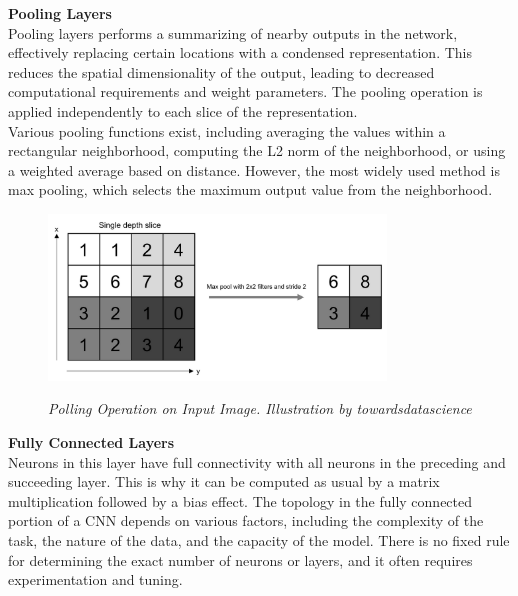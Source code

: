 \newpage

\vspace{0.5cm}
\textbf{Pooling Layers} \\

Pooling layers performs a summarizing of nearby outputs in the network, effectively replacing certain locations with a condensed representation. This reduces the spatial dimensionality of the output, leading to decreased computational requirements and weight parameters. The pooling operation is applied independently to each slice of the representation. \\

Various pooling functions exist, including averaging the values within a rectangular neighborhood, computing the L2 norm of the neighborhood, or using a weighted average based on distance. However, the most widely used method is max pooling, which selects the maximum output value from the neighborhood.

\begin{figure}[H]
\centering
\includegraphics[width=0.8\textwidth]{imatges/preliminaries/polling-layer.png}
\caption[Polling Operation on Input Image]{\textit{Polling Operation on Input Image. Illustration by towardsdatascience}}
{\label{fig:polling-layer}}
\end{figure}

\vspace{0.5cm}
\textbf{Fully Connected Layers} \\

Neurons in this layer have full connectivity with all neurons in the preceding and succeeding layer. This is why it can be computed as usual by a matrix multiplication followed by a bias effect. The topology in the fully connected portion of a CNN depends on various factors, including the complexity of the task, the nature of the data, and the capacity of the model. There is no fixed rule for determining the exact number of neurons or layers, and it often requires experimentation and tuning. \\

